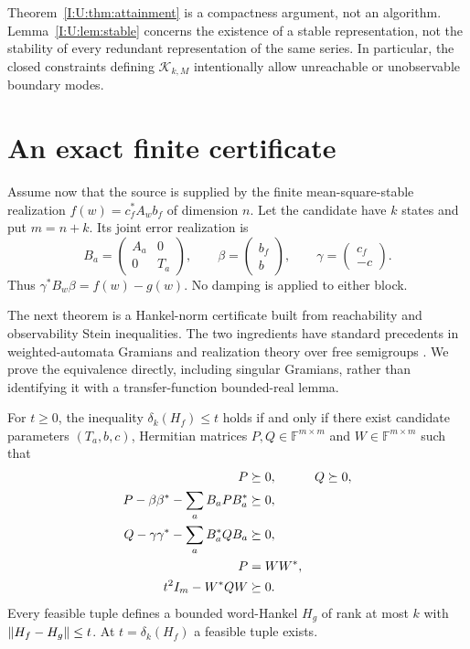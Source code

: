 \begin{remark}
Theorem~\ref{I:U:thm:attainment} is a compactness argument, not an algorithm. Lemma~\ref{I:U:lem:stable} concerns the existence of a stable representation, not the stability of every redundant representation of the same series. In particular, the closed constraints defining $\mathcal K_{k,M}$ intentionally allow unreachable or unobservable boundary modes.
\end{remark}

\section{An exact finite certificate}\label{I:U:sec:exact}
Assume now that the source is supplied by the finite mean-square-stable realization
$f(w)=c_f^*A_wb_f$ of dimension $n$. Let the candidate have $k$ states and put $m=n+k$. Its joint error realization is
\begin{equation}\label{I:U:eq:error-realization}
 B_a=\begin{pmatrix}A_a&0\\0&T_a\end{pmatrix},\qquad
 \beta=\begin{pmatrix}b_f\\b\end{pmatrix},\qquad
 \gamma=\begin{pmatrix}c_f\\-c\end{pmatrix}.
\end{equation}
Thus $\gamma^*B_w\beta=f(w)-g(w)$. No damping is applied to either block.

The next theorem is a Hankel-norm certificate built from reachability and observability Stein inequalities. The two ingredients have standard precedents in weighted-automata Gramians \cite{sva2019} and realization theory over free semigroups \cite{ball2005}. We prove the equivalence directly, including singular Gramians, rather than identifying it with a transfer-function bounded-real lemma.

\begin{theorem}\label{I:U:thm:exact}
For $t\ge0$, the inequality $\delta_k(H_f)\le t$ holds if and only if there exist candidate parameters $(T_a,b,c)$, Hermitian matrices $P,Q\in\mathbb F^{m\times m}$ and $W\in\mathbb F^{m\times m}$ such that
\begin{align}
 P&\succeq0, & Q&\succeq0,\label{I:U:eq:exact-positive}\\
 P-\beta\beta^*-\sum_aB_aPB_a^*&\succeq0,\label{I:U:eq:exact-reach}\\
 Q-\gamma\gamma^*-\sum_aB_a^*QB_a&\succeq0,\label{I:U:eq:exact-observe}\\
 P&=WW^*,\label{I:U:eq:exact-factor}\\
 t^2I_m-W^*QW&\succeq0.\label{I:U:eq:exact-norm}
\end{align}
Every feasible tuple defines a bounded word-Hankel $H_g$ of rank at most $k$ with $\left\lVert H_f-H_g\right\rVert\le t$. At $t=\delta_k(H_f)$ a feasible tuple exists.
\end{theorem}


